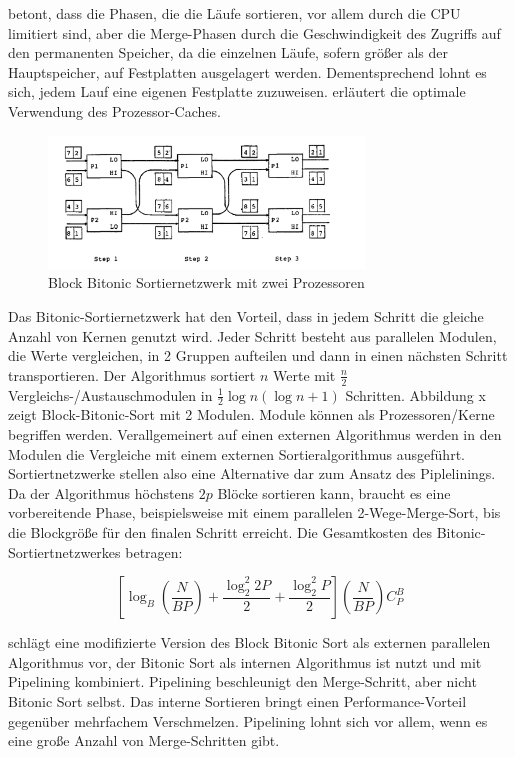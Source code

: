 \documentclass[a4paper,12pt,twoside]{article}
\begin{document}
{\textcite{Salzberg1990}} betont, dass die Phasen, die die Läufe sortieren, vor allem durch die CPU limitiert sind, aber die Merge-Phasen durch die Geschwindigkeit des Zugriffs auf den permanenten Speicher, da die einzelnen Läufe, sofern größer als der Hauptspeicher, auf Festplatten ausgelagert werden. Dementsprechend lohnt es sich, jedem Lauf eine eigenen Festplatte zuzuweisen. {\textcite{Hao2009}} erläutert die optimale Verwendung des Prozessor-Caches.

\begin{figure}
	\centering
	\includegraphics[width=0.75\textwidth]{Bilder/bitonic_block.png}
	\caption{Block Bitonic Sortiernetzwerk mit zwei Prozessoren \autocite[S. 335]{Bitton1983}}
	\label{img:bitonic}
\end{figure}

Das Bitonic-Sortiernetzwerk {\autocite[S. 335f]{Bitton1983}} hat den Vorteil, dass in jedem Schritt die gleiche Anzahl von Kernen genutzt wird. Jeder Schritt besteht aus parallelen Modulen, die Werte vergleichen, in 2 Gruppen aufteilen und dann in einen nächsten Schritt transportieren. Der Algorithmus sortiert $n$ Werte mit $\frac {n} {2} $ Vergleichs-/Austauschmodulen in $\frac{1}{2} \log n (\log n +1)$ Schritten. Abbildung x zeigt Block-Bitonic-Sort mit 2 Modulen. Module können als Prozessoren/Kerne begriffen werden. Verallgemeinert auf einen externen Algorithmus werden in den Modulen die Vergleiche mit einem externen Sortieralgorithmus ausgeführt. Sortiertnetzwerke stellen also eine Alternative dar zum Ansatz des Piplelinings. Da der Algorithmus höchstens $2p$ Blöcke sortieren kann, braucht es eine vorbereitende Phase, beispielsweise mit einem parallelen 2-Wege-Merge-Sort, bis die Blockgröße für den finalen Schritt erreicht. Die Gesamtkosten des Bitonic-Sortiertnetzwerkes betragen:

\[ \left[ \log _B (\frac {N} {B P}) + \frac {\log _2 ^2 2 P} {2} + \frac {\log _2 ^2 P} {2} \right] ( \frac {N}{B P}) C _{P} ^{B} \]

{\textcite{Menon1986}} schlägt eine modifizierte Version des Block Bitonic Sort als externen parallelen Algorithmus vor, der Bitonic Sort als internen Algorithmus ist nutzt und mit Pipelining kombiniert. Pipelining beschleunigt den Merge-Schritt, aber nicht Bitonic Sort selbst. Das interne Sortieren bringt einen Performance-Vorteil gegenüber mehrfachem Verschmelzen. Pipelining lohnt sich vor allem, wenn es eine große Anzahl von Merge-Schritten gibt.
\end{document}
